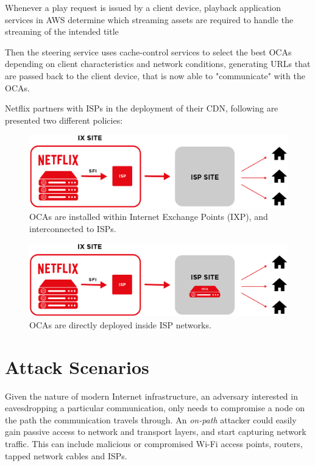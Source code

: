 Whenever a play request is issued by a client device, playback application
services in AWS determine which streaming assets are required to handle the
streaming of the intended title

Then the steering service uses cache-control services to select the best OCAs
depending on client characteristics and network conditions, generating URLs
that are passed back to the client device, that is now able to "communicate"
with the OCAs.


Netflix partners with ISPs in the deployment of their CDN, following are
presented two different policies:

\begin{figure}[!htb]
  \centering
  \includegraphics[width=\columnwidth]{img/oca_1.png}
  \caption{OCAs are installed within Internet Exchange Points (IXP), and
  interconnected to ISPs. \cite{netflix_oca}}
  \label{fig:oca_1}
\end{figure}

\begin{figure}[!htb]
  \centering
  \includegraphics[width=\columnwidth]{img/oca_2.png}
  \caption{OCAs are directly deployed inside ISP networks. \cite{netflix_oca}}
  \label{fig:oca_2}
\end{figure}

\section{Attack Scenarios}\label{attack_scenarios}

Given the nature of modern Internet infrastructure, an adversary interested in
eavesdropping a particular communication, only needs to compromise a node on
the path the communication travels through. An \emph{on-path} attacker could
easily gain passive access to network and transport layers, and start capturing
network traffic. This can include malicious or compromised Wi-Fi access
points, routers, tapped network cables and ISPs. 


